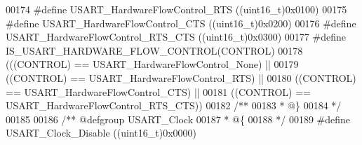 \begin{DoxyCode}
00174 \textcolor{preprocessor}{#}\textcolor{preprocessor}{define} \textcolor{preprocessor}{USART\_HardwareFlowControl\_RTS}        \textcolor{preprocessor}{(}\textcolor{preprocessor}{(}\textcolor{preprocessor}{uint16\_t}\textcolor{preprocessor}{)}0x0100\textcolor{preprocessor}{)}
00175 \textcolor{preprocessor}{#}\textcolor{preprocessor}{define} \textcolor{preprocessor}{USART\_HardwareFlowControl\_CTS}        \textcolor{preprocessor}{(}\textcolor{preprocessor}{(}\textcolor{preprocessor}{uint16\_t}\textcolor{preprocessor}{)}0x0200\textcolor{preprocessor}{)}
00176 \textcolor{preprocessor}{#}\textcolor{preprocessor}{define} \textcolor{preprocessor}{USART\_HardwareFlowControl\_RTS\_CTS}    \textcolor{preprocessor}{(}\textcolor{preprocessor}{(}\textcolor{preprocessor}{uint16\_t}\textcolor{preprocessor}{)}0x0300\textcolor{preprocessor}{)}
00177 \textcolor{preprocessor}{#}\textcolor{preprocessor}{define} \textcolor{preprocessor}{IS\_USART\_HARDWARE\_FLOW\_CONTROL}\textcolor{preprocessor}{(}\textcolor{preprocessor}{CONTROL}\textcolor{preprocessor}{)}
00178                               \textcolor{preprocessor}{(}\textcolor{preprocessor}{(}\textcolor{preprocessor}{(}\textcolor{preprocessor}{CONTROL}\textcolor{preprocessor}{)} \textcolor{preprocessor}{==} USART_HardwareFlowControl_None\textcolor{preprocessor}{)} \textcolor{preprocessor}{||}
00179                                \textcolor{preprocessor}{(}\textcolor{preprocessor}{(}\textcolor{preprocessor}{CONTROL}\textcolor{preprocessor}{)} \textcolor{preprocessor}{==} USART_HardwareFlowControl_RTS\textcolor{preprocessor}{)} \textcolor{preprocessor}{||}
00180                                \textcolor{preprocessor}{(}\textcolor{preprocessor}{(}\textcolor{preprocessor}{CONTROL}\textcolor{preprocessor}{)} \textcolor{preprocessor}{==} USART_HardwareFlowControl_CTS\textcolor{preprocessor}{)} \textcolor{preprocessor}{||}
00181                                \textcolor{preprocessor}{(}\textcolor{preprocessor}{(}\textcolor{preprocessor}{CONTROL}\textcolor{preprocessor}{)} \textcolor{preprocessor}{==} 
      USART_HardwareFlowControl_RTS_CTS\textcolor{preprocessor}{)}\textcolor{preprocessor}{)}
00182 \textcolor{comment}{/**}
00183 \textcolor{comment}{  * @\}}
00184 \textcolor{comment}{  */}
00185 
00186 \textcolor{comment}{/** @defgroup USART\_Clock }
00187 \textcolor{comment}{  * @\{}
00188 \textcolor{comment}{  */}
00189 \textcolor{preprocessor}{#}\textcolor{preprocessor}{define} \textcolor{preprocessor}{USART\_Clock\_Disable}                  \textcolor{preprocessor}{(}\textcolor{preprocessor}{(}\textcolor{preprocessor}{uint16\_t}\textcolor{preprocessor}{)}0x0000\textcolor{preprocessor}{)}

\end{DoxyCode}
